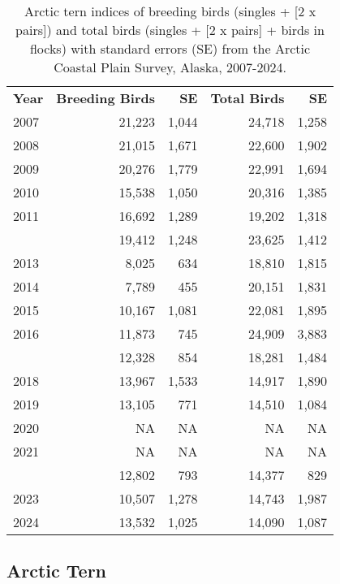 \documentclass[
]{article}
\begin{document}
\begin{longtable}[t]{lrrrr}

\caption{\label{tbl-ARTE}Arctic tern indices of breeding birds (singles
+ {[}2 x pairs{]}) and total birds (singles + {[}2 x pairs{]} + birds in
flocks) with standard errors (SE) from the Arctic Coastal Plain Survey,
Alaska, 2007-2024.}

\tabularnewline

\\
\toprule
\textbf{Year} & \textbf{Breeding Birds} & \textbf{SE} & \textbf{Total Birds} & \textbf{SE}\\
\midrule
2007 & 21,223 & 1,044 & 24,718 & 1,258\\
2008 & 21,015 & 1,671 & 22,600 & 1,902\\
2009 & 20,276 & 1,779 & 22,991 & 1,694\\
2010 & 15,538 & 1,050 & 20,316 & 1,385\\
2011 & 16,692 & 1,289 & 19,202 & 1,318\\
\addlinespace
2012 & 19,412 & 1,248 & 23,625 & 1,412\\
2013 & 8,025 & 634 & 18,810 & 1,815\\
2014 & 7,789 & 455 & 20,151 & 1,831\\
2015 & 10,167 & 1,081 & 22,081 & 1,895\\
2016 & 11,873 & 745 & 24,909 & 3,883\\
\addlinespace
2017 & 12,328 & 854 & 18,281 & 1,484\\
2018 & 13,967 & 1,533 & 14,917 & 1,890\\
2019 & 13,105 & 771 & 14,510 & 1,084\\
2020 & NA & NA & NA & NA\\
2021 & NA & NA & NA & NA\\
\addlinespace
2022 & 12,802 & 793 & 14,377 & 829\\
2023 & 10,507 & 1,278 & 14,743 & 1,987\\
2024 & 13,532 & 1,025 & 14,090 & 1,087\\
\bottomrule

\end{longtable}

\endgroup{}

\newpage{}

\subsection*{Arctic Tern}\label{arctic-tern-2}
\end{document}
